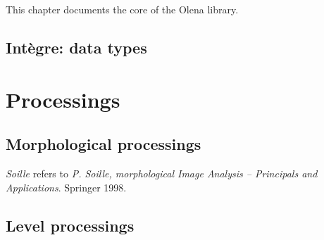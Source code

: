 \documentclass{book}
\newcommand\integre{Int\`egre}
\begin{document}
This chapter documents the core of the Olena library.

\section{\integre: data types}



\chapter{Processings}

\section{Morphological processings}

\emph{Soille} refers to \emph{P. Soille, morphological Image Analysis
-- Principals and Applications}.  Springer 1998.



\section{Level processings}


\end{document}

